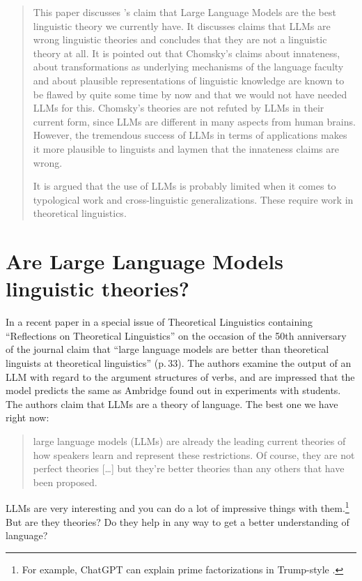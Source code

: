 
\begin{abstract}
This paper discusses \citeauthor{AmbridgeBlything2024a}'s claim \citeyearpar{AmbridgeBlything2024a}
that Large Language Models are the best linguistic theory we currently have. It discusses claims
that LLMs are wrong linguistic theories and concludes that they are not a linguistic theory at
all. It is pointed out that Chomsky's claims about innateness, about transformations as underlying
mechanisms of the language faculty and about plausible representations of linguistic knowledge are
known to be flawed by quite some time by now and that we would not have needed LLMs for
this. Chomsky's theories are not refuted by LLMs in their current form, since LLMs are different in
many aspects from human brains. However, the tremendous success of LLMs in terms of applications
makes it more plausible to linguists and laymen that the innateness claims are wrong. 

It is argued that the use of LLMs is probably limited when it comes to typological work and
cross-linguistic generalizations. These require work in theoretical linguistics.
\end{abstract}

\section{Are Large Language Models linguistic theories?}

In a recent paper in a special issue of Theoretical Linguistics containing ``Reflections on
Theoretical Linguistics'' on the occasion of the 50th anniversary of the journal
\citet{AmbridgeBlything2024a} claim that ``large language models are better than theoretical
linguists at theoretical linguistics'' (p.\,33). The authors examine the output of an LLM with
regard to the argument structures of verbs, and are impressed that the model predicts the same as
Ambridge found out in experiments with students. The authors claim that LLMs are a theory of
language. The best one we have right now:
\begin{quote}
large language models (LLMs) are already the leading current theories of how speakers learn and
represent these restrictions. Of course, they are not perfect theories [\ldots] but they’re better
theories than any others that have been proposed. \citet[]{AmbridgeBlything2024a}
\end{quote}
LLMs are very interesting and you can do a lot of impressive things with them.\footnote{%
For example, ChatGPT can explain prime factorizations in Trump-style \citep[356--357]{Piantadosi2024a}.
} But are they theories? Do they help in any way to get a better understanding of language?

